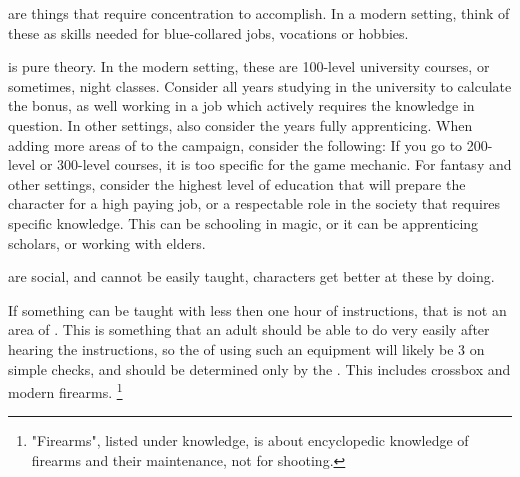  are things that require concentration to accomplish.
In a modern setting, think of these as skills needed for blue-collared jobs, vocations or hobbies.

 is pure theory.
In the modern setting, these are 100-level university courses, or sometimes, night classes.
Consider all years studying in the university to calculate the bonus, as well working in a job which actively requires the knowledge in question.
In other settings, also consider the years fully apprenticing.
When adding more areas of  to the campaign, consider the following:
If you go to 200-level or 300-level courses, it is too specific for the game mechanic.
For fantasy and other settings, consider the highest level of
education that will prepare the character for a high paying job, or a respectable role in the society that requires specific knowledge.
This can be schooling in magic, or it can be apprenticing scholars, or working with elders.
\par
{} are social, and cannot be easily taught, characters get better at these by doing.\par

If something can be taught with less then one hour of instructions, that is not an area of .
This is something that an adult should be able to do very easily after hearing the instructions,
so the  of using such an equipment will likely be 3 on simple checks,
and should be determined only by the .
This includes crossbox and modern firearms.
\footnote{"Firearms", listed under knowledge, is about encyclopedic knowledge of firearms and their maintenance, not for shooting.}








